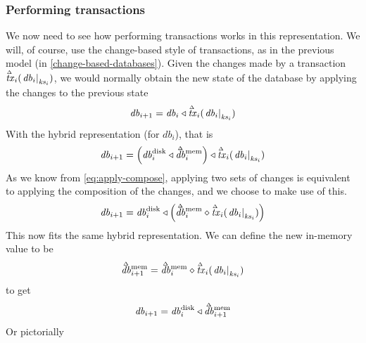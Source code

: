 \documentclass[11pt,a4paper]{article}
\newcommand\restrict[2]{\left.#1\right|_{#2}}
\newcommand\deltavar[1]{\accentset{\Delta}{#1}}
\begin{document}
\subsubsection{Performing transactions}
\label{performing-transactions}
We now need to see how performing transactions works in this representation. We
will, of course, use the change-based style of transactions, as in the previous
model (in \cref{change-based-databases}). Given the changes
made by a transaction $\deltavar{\mathit{tx}}_i(\restrict{\mathit{db}_i}{\mathit{ks}_i})$,
we would normally obtain the new state of the database by applying the changes
to the previous state
\[
\mathit{db}_{i+1} = \mathit{db}_i \triangleleft \deltavar{\mathit{tx}}_i(\restrict{\mathit{db}_i}{\mathit{ks}_i})
\]
With the hybrid representation (for $\mathit{db}_i$), that is
\[
\mathit{db}_{i+1} = \left( \mathit{db}^{\mathrm{disk}}_i \triangleleft \deltavar{\mathit{db}}^{\mathrm{mem}}_i \right)
      \triangleleft \deltavar{\mathit{tx}}_i(\restrict{\mathit{db}_i}{\mathit{ks}_i})
\]
As we know from \cref{eq:apply-compose}, applying two sets of changes is
equivalent to applying the composition of the changes, and we choose to make
use of this.
\[
\mathit{db}_{i+1} = \mathit{db}^{\mathrm{disk}}_i
      \triangleleft \left( \deltavar{\mathit{db}}^{\mathrm{mem}}_i
                  \diamond \deltavar{\mathit{tx}}_i(\restrict{\mathit{db}_i}{\mathit{ks}_i})
                    \right)
\]
This now fits the same hybrid representation. We can define the new in-memory
value to be
\[
\deltavar{\mathit{db}}^{\mathrm{mem}}_{i+1} = \deltavar{\mathit{db}}^{\mathrm{mem}}_i
                  \diamond \deltavar{\mathit{tx}}_i(\restrict{\mathit{db}_i}{\mathit{ks}_i})
\]
to get
\[
\mathit{db}_{i+1} = \mathit{db}^{\mathrm{disk}}_i
      \triangleleft \deltavar{\mathit{db}}^{\mathrm{mem}}_{i+1}
\]
Or pictorially
\end{document}
